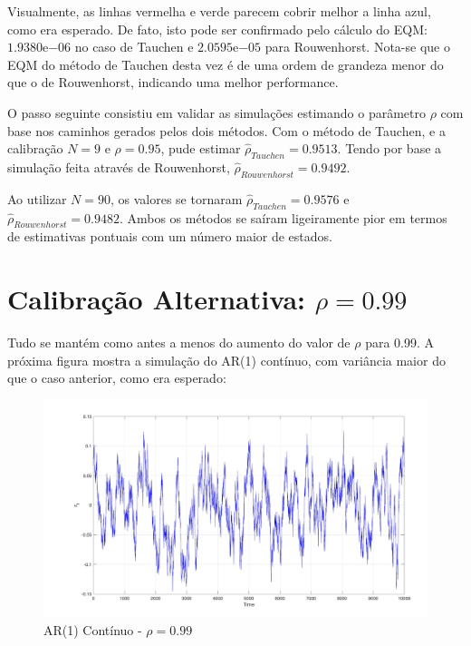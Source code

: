 \documentclass[10pt]{article}
\begin{document}
Visualmente, as linhas vermelha e verde parecem cobrir melhor a linha azul, como era esperado. De fato, isto pode ser confirmado pelo cálculo do EQM: $1.9380\mathrm{e}{-06}$ no caso de Tauchen e $2.0595\mathrm{e}{-05}$ para Rouwenhorst. Nota-se que o EQM do método de Tauchen desta vez é de uma ordem de grandeza menor do que o de Rouwenhorst, indicando uma melhor performance.

O passo seguinte consistiu em validar as simulações estimando o parâmetro $\rho$ com base nos caminhos gerados pelos dois métodos. Com o método de Tauchen, e a calibração $N = 9$ e $\rho = 0.95$, pude estimar $\hat{\rho}_{Tauchen} = 0.9513$. Tendo por base a simulação feita através de Rouwenhorst, $\hat{\rho}_{Rouwenhorst} = 0.9492$.

Ao utilizar $N = 90$, os valores se tornaram  $\hat{\rho}_{Tauchen} = 0.9576$ e $\hat{\rho}_{Rouwenhorst} = 0.9482$. Ambos os métodos se saíram ligeiramente pior em termos de estimativas pontuais com um número maior de estados.

\section*{Calibração Alternativa: $\rho = 0.99$}
Tudo se mantém como antes a menos do aumento do valor de $\rho$ para 0.99. A próxima figura mostra a simulação do AR(1) contínuo, com variância maior do que o caso anterior, como era esperado:
\begin{figure}[h!]
	\centering
	\includegraphics[scale=0.2]{cont_path_99.jpg}
	\caption{AR(1) Contínuo - $\rho = 0.99$}
\end{figure}
\end{document}
